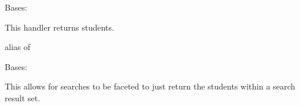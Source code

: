 \documentclass[letterpaper,10pt,english]{sphinxmanual}
\begin{document}
\begin{fulllineitems}
\label{generated/apps.profiles.handlers:apps.profiles.handlers.StudentHandler}
Bases: 

This handler returns students.


\begin{fulllineitems}
\label{generated/apps.profiles.handlers:apps.profiles.handlers.StudentHandler.model}
alias of 

\end{fulllineitems}



\begin{fulllineitems}
\label{generated/apps.profiles.handlers:apps.profiles.handlers.StudentHandler.queryset}
\end{fulllineitems}


\end{fulllineitems}



\begin{fulllineitems}
\label{generated/apps.profiles.handlers:apps.profiles.handlers.StudentResultHandler}
Bases: {\hyperref[generated/apps.profiles.handlers:apps.profiles.handlers.ResultHandler]{}}

This  allows for searches to be faceted to just return the students
within a search result set.


\begin{fulllineitems}
\label{generated/apps.profiles.handlers:apps.profiles.handlers.StudentResultHandler.read}
\end{fulllineitems}


\end{fulllineitems}
\end{document}
